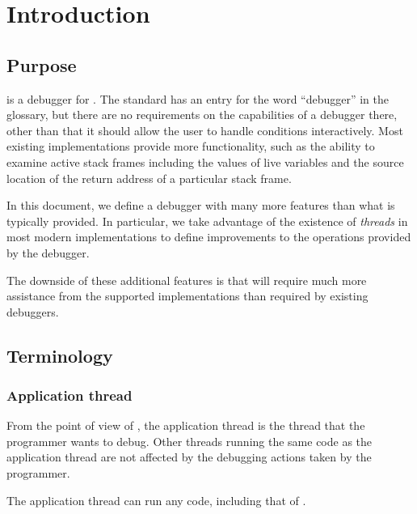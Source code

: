 \chapter{Introduction}
%

\section{Purpose}

\sysname{} is a debugger for \commonlisp{}.  The \commonlisp{}
standard has an entry for the word ``debugger'' in the glossary, but
there are no requirements on the capabilities of a debugger there,
other than that it should allow the user to handle conditions
interactively.  Most existing implementations provide more
functionality, such as the ability to examine active stack frames
including the values of live variables and the source location of the
return address of a particular stack frame.

In this document, we define a debugger with many more features than
what is typically provided.  In particular, we take advantage of the
existence of \emph{threads} in most modern \commonlisp{}
implementations to define improvements to the operations provided by
the debugger.

The downside of these additional features is that \sysname{} will
require much more assistance from the supported implementations than
required by existing debuggers.

\section{Terminology}

%
\def\Applicationthread{Application thread}%
\def\applicationthread{application thread}%
\def\applicationthreads{application threads}%
\subsection{\Applicationthread{}}

From the point of view of \sysname{}, the \applicationthread{} is the
thread that the programmer wants to debug.  Other threads running the
same code as the \applicationthread{} are not affected by the
debugging actions taken by the programmer.

The \applicationthread{} can run any code, including that of
\sysname{}.

%
\def\Debuggerthread{Debugger thread}%
\def\debuggerthread{debugger thread}%
\def\debuggerthreads{debugger threads}%
